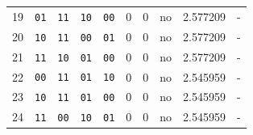 \begin{center}
{\begin{tabular}{rccccrrcrl}
19 & \texttt{01} & \texttt{11} & \texttt{10} & \texttt{00} & 0 & 0 & no & 2.577209 & - \\
20 & \texttt{10} & \texttt{11} & \texttt{00} & \texttt{01} & 0 & 0 & no & 2.577209 & - \\
21 & \texttt{11} & \texttt{10} & \texttt{01} & \texttt{00} & 0 & 0 & no & 2.577209 & - \\
22 & \texttt{00} & \texttt{11} & \texttt{01} & \texttt{10} & 0 & 0 & no & 2.545959 & - \\
23 & \texttt{10} & \texttt{11} & \texttt{01} & \texttt{00} & 0 & 0 & no & 2.545959 & - \\
24 & \texttt{11} & \texttt{00} & \texttt{10} & \texttt{01} & 0 & 0 & no & 2.545959 & - \\
\bottomrule
\end{tabular}
}
\end{center}

